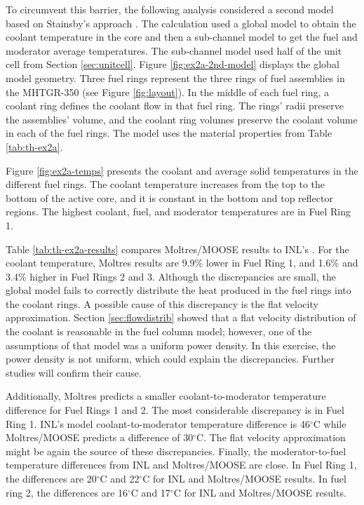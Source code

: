 To circumvent this barrier, the following analysis considered a second model based on Stainsby's approach \cite{stainsby_investigation_2008}.
The calculation used a global model to obtain the coolant temperature in the core and then a sub-channel model to get the fuel and moderator average temperatures.
The sub-channel model used half of the unit cell from Section \ref{sec:unitcell}.
Figure \ref{fig:ex2a-2nd-model} displays the global model geometry.
Three fuel rings represent the three rings of fuel assemblies in the MHTGR-350 (see Figure \ref{fig:layout}).
In the middle of each fuel ring, a coolant ring defines the coolant flow in that fuel ring.
The rings' radii preserve the assemblies' volume, and the coolant ring volumes preserve the coolant volume in each of the fuel rings.
The model uses the material properties from Table \ref{tab:th-ex2a}.

Figure \ref{fig:ex2a-temps} presents the coolant and average solid temperatures in the different fuel rings.
The coolant temperature increases from the top to the bottom of the active core, and it is constant in the bottom and top reflector regions.
The highest coolant, fuel, and moderator temperatures are in Fuel Ring 1.

Table \ref{tab:th-ex2a-results} compares Moltres/MOOSE results to INL's \cite{strydom_inl_2013}.
For the coolant temperature, Moltres results are 9.9\% lower in Fuel Ring 1, and 1.6\% and 3.4\% higher in Fuel Rings 2 and 3.
Although the discrepancies are small, the global model fails to correctly distribute the heat produced in the fuel rings into the coolant rings.
A possible cause of this discrepancy is the flat velocity approximation.
Section \ref{sec:flowdistrib} showed that a flat velocity distribution of the coolant is reasonable in the fuel column model; however, one of the assumptions of that model was a uniform power density.
In this exercise, the power density is not uniform, which could explain the discrepancies.
Further studies will confirm their cause.

Additionally, Moltres predicts a smaller coolant-to-moderator temperature difference for Fuel Rings 1 and 2.
The most considerable discrepancy is in Fuel Ring 1.
INL's model coolant-to-moderator temperature difference is 46$^{\circ}$C while Moltres/MOOSE predicts a difference of 30$^{\circ}$C.
The flat velocity approximation might be again the source of these discrepancies.
Finally, the moderator-to-fuel temperature differences from INL and Moltres/MOOSE are close.
In Fuel Ring 1, the differences are 20$^{\circ}$C and 22$^{\circ}$C for INL and Moltres/MOOSE results.
In fuel ring 2, the differences are 16$^{\circ}$C and 17$^{\circ}$C for INL and Moltres/MOOSE results.

